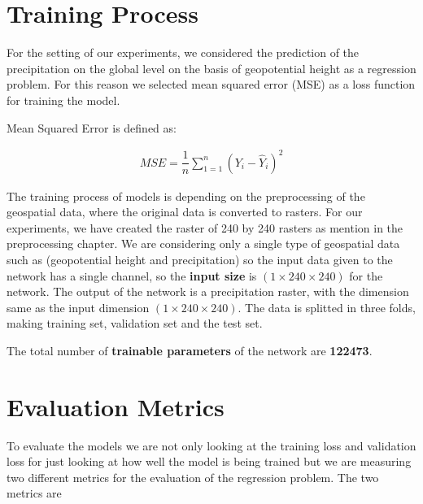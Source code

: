 \newpage

\section{Training Process}

For the setting of our experiments, we considered the prediction of the precipitation on the global level on the basis of geopotential height as a regression problem. For this reason we selected mean squared error (MSE) as a loss function for training the model.

Mean Squared Error is defined as:

\begin{gather*}
    MSE = \dfrac{1}{n}\sum_{1 = 1}^{n}(Y_i-\hat{Y}_i )^2
\end{gather*}

The training process of models is depending on the preprocessing of the geospatial data, where the original data is converted to rasters. For our experiments, we have created the raster of 240 by 240 rasters as mention in the preprocessing chapter.
We are considering only a single type of geospatial data such as (geopotential height and precipitation) so the input data given to the network has a single channel, so the \textbf{input size} is $(1 \times 240  \times 240)$ for the network.
The output of the network is a precipitation raster, with the dimension same as the input dimension $(1 \times 240  \times 240)$. The data is splitted in three folds, making training set, validation set and the test set.

The total number of \textbf{trainable parameters} of the network are \textbf{122473}.
\section{Evaluation Metrics}

To evaluate the models we are not only looking at the training loss and validation loss for just looking at how well the model is being trained but we are measuring two different metrics for the evaluation of the regression problem.
The two metrics are

